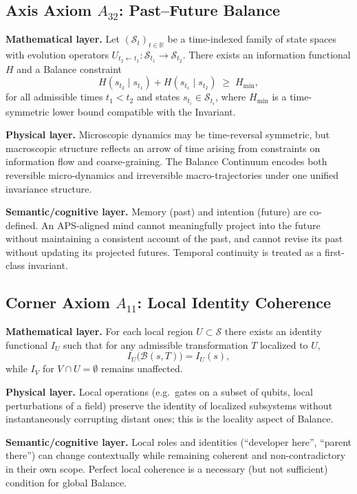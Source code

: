 \subsection{Axis Axiom $A_{32}$: Past–Future Balance}

\begin{axiom}
\label{ax:past-future}
\textbf{Mathematical layer.}
Let $(\mathcal{S}_t)_{t \in \mathbb{R}}$ be a time-indexed family of state spaces with evolution operators $U_{t_2 \leftarrow t_1} : \mathcal{S}_{t_1} \to \mathcal{S}_{t_2}$.
There exists an information functional $H$ and a Balance constraint
\[
  H(s_{t_2} \mid s_{t_1})
  +
  H(s_{t_1} \mid s_{t_2})
  \;\geq\;
  H_{\mathrm{min}},
\]
for all admissible times $t_1 < t_2$ and states $s_{t_i} \in \mathcal{S}_{t_i}$, where $H_{\mathrm{min}}$ is a time-symmetric lower bound compatible with the Invariant.

\textbf{Physical layer.}
Microscopic dynamics may be time-reversal symmetric, but macroscopic structure reflects an arrow of time arising from constraints on information flow and coarse-graining.
The Balance Continuum encodes both reversible micro-dynamics and irreversible macro-trajectories under one unified invariance structure.\cite{AurphyxThesis}

\textbf{Semantic/cognitive layer.}
Memory (past) and intention (future) are co-defined.
An APS-aligned mind cannot meaningfully project into the future without maintaining a consistent account of the past, and cannot revise its past without updating its projected futures.
Temporal continuity is treated as a first-class invariant.
\end{axiom}

\subsection{Corner Axiom $A_{11}$: Local Identity Coherence}

\begin{axiom}
\label{ax:local-identity}
\textbf{Mathematical layer.}
For each local region $U \subset \mathcal{S}$ there exists an identity functional $I_U$ such that for any admissible transformation $T$ localized to $U$,
\[
  I_U\bigl(\mathcal{B}(s,T)\bigr)
  =
  I_U(s),
\]
while $I_V$ for $V \cap U = \emptyset$ remains unaffected.

\textbf{Physical layer.}
Local operations (e.g.\ gates on a subset of qubits, local perturbations of a field) preserve the identity of localized subsystems without instantaneously corrupting distant ones; this is the locality aspect of Balance.\cite{AurphyxFractalQC}

\textbf{Semantic/cognitive layer.}
Local roles and identities (``developer here'', ``parent there'') can change contextually while remaining coherent and non-contradictory in their own scope.
Perfect local coherence is a necessary (but not sufficient) condition for global Balance.
\end{axiom}


